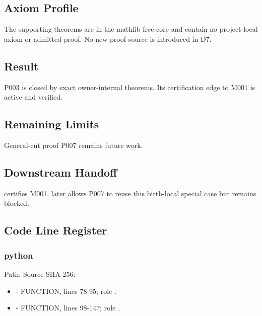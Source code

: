 \subsection{Axiom Profile}\label{axiom-profile-5}

The supporting theorems are in the mathlib-free core and contain no
project-local axiom or admitted proof. No new proof source is introduced
in D7.

\subsection{Result}\label{result-18}

P003 is closed by exact owner-internal theorems. Its certification edge
to M001 is active and verified.

\subsection{Remaining Limits}\label{remaining-limits-5}

General-cut proof P007 remains future work.

\subsection{Downstream Handoff}\label{downstream-handoff-18}

\texttt{\protect{}} certifies M001. \texttt{\protect{}} later allows P007 to reuse
this birth-local special case but remains blocked.

\subsection{Code Line Register}\label{code-line-register-5}

\subsubsection{python}\label{python-5}

Path:
Source SHA-256:
\texttt{\protect{}}

\begin{itemize}
\tightlist
\item
  \texttt{\protect{}} - FUNCTION,
  lines 78-95; role \texttt{\protect{}}.
\item
  \texttt{\protect{}} - FUNCTION, lines
  98-147; role \texttt{\protect{}}.
\end{itemize}

